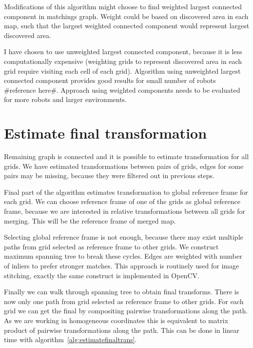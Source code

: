 Modifications of this algorithm might choose to find weighted largest connected component in matchings graph. Weight could be based on discovered area in each map, such that the largest weighted connected component would represent largest discovered area.

I have chosen to use unweighted largest connected component, because it is less computationally expensive (weighting grids to represent discovered area in each grid require visiting each cell of each grid). Algorithm using unweighted largest connected component provides good results for small number of robots \#reference here\#. Approach using weighted components needs to be evaluated for more robots and larger environments.


\section{Estimate final transformation} %
\label{sec:estimatefinaltransformation}

Remaining graph is connected and it is possible to estimate transformation for all grids. We have estimated transformations between pairs of grids, edges for some pairs may be missing, because they were filtered out in previous steps.

Final part of the algorithm estimates transformation to global reference frame for each grid. We can choose reference frame of one of the grids as global reference frame, because we are interested in relative transformations between all grids for merging. This will be the reference frame of merged map.

Selecting global reference frame is not enough, because there may exist multiple paths from grid selected as reference frame to other grids. We construct maximum spanning tree to break these cycles. Edges are weighted with number of inliers to prefer stronger matches. This approach is routinely used for image stitching, exactly the same construct is implemented in \gls{OpenCV}.

Finally we can walk through spanning tree to obtain final transforms. There is now only one path from grid selected as reference frame to other grids. For each grid we can get the final by compositing pairwise transformations along the path. As we are working in homogeneous coordinates this is equivalent to matrix product of pairwise transformations along the path. This can be done in linear time with algorithm~\ref{alg:estimatefinaltrans}.

